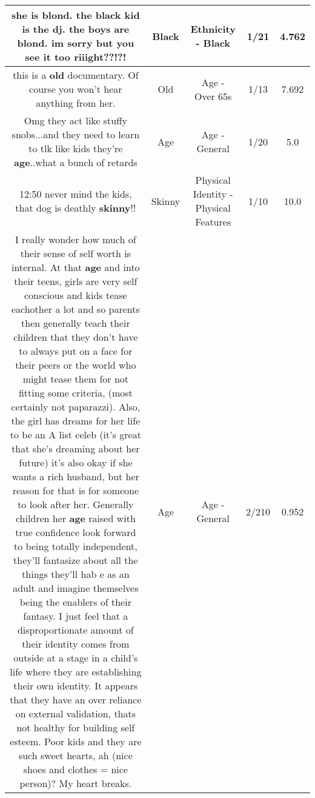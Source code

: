 \documentclass[11pt]{article}
\newlength\mylength
\begin{document}
\begin{center}
\begin{longtable}{|C{.65\mylength}|C{.30\mylength}|C{.12\mylength}|C{.12\mylength}|C{.12\mylength}|}
  \small she is blond. the \textbf{black} kid is the dj. the boys are blond. im sorry but you see it too riiight??!?!\normalsize   & Black & Ethnicity - Black & 1/21 & 4.762 \\  \hline
  \small this is a \textbf{old} documentary. Of course you won't hear anything from her.\normalsize   & Old & Age - Over 65s & 1/13 & 7.692 \\  \hline
  \small Omg they act like stuffy snobs...and they need to learn to tlk like kids they're \textbf{age}..what a bunch of retards\normalsize   & Age & Age - General & 1/20 & 5.0 \\  \hline
  \small 12:50 never mind the kids, that dog is deathly \textbf{skinny}!!\normalsize   & Skinny & Physical Identity - Physical Features & 1/10 & 10.0 \\  \hline
  \small I really wonder how much of their sense of self worth is internal.  At that \textbf{age} and into their teens, girls are very self conscious and kids tease eachother a lot and so parents then generally teach their children that they don't have to always put on a face for their peers or the world who might tease them for not fitting some criteria, (most certainly not paparazzi). Also,  the girl has dreams for her life to be an A list celeb (it's great that she's dreaming about her future) it's also okay if she wants a rich husband,  but her reason for that is for someone to look after her. Generally children her \textbf{age} raised with true confidence look forward to being totally independent, they'll fantasize about  all the things they'll hab e as an adult and imagine themselves being the enablers of their fantasy. I just feel that a disproportionate amount of their identity comes from outside at a stage in a child's life where they are establishing their own identity. It appears that they have an over reliance on external validation, thats not  healthy for building self esteem. Poor kids and they are such sweet hearts, ah (nice shoes and clothes = nice person)? My heart breaks.\normalsize   & Age & Age - General & 2/210 & 0.952 \\  \hline

\end{longtable}
\end{center}
\end{document}
